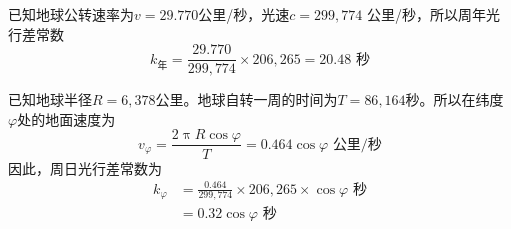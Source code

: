 已知地球公转速率为$v=29.770$公里/秒，光速$c=299,774$
公里/秒，所以周年光行差常数
  \begin{equation*}
    k_\text{年}=\frac{29.770}{299,774}\times 206,265=20.48\text{ 秒}
  \end{equation*}

已知地球半径$R=6,378$公里。地球自转一周的时间为$T=
86,164$秒。所以在纬度$\varphi$处的地面速度为
\begin{equation*}
  v_\varphi=\frac{2\uppi R\cos\varphi}{T}=0.464\cos\varphi\text{ 公里/秒}
\end{equation*}
因此，周日光行差常数为
\begin{align*}
  k_\varphi & =\frac{0.464}{299,774}\times 206,265\times\cos\varphi\text{ 秒} \\
            & =0.32\cos\varphi\text{ 秒}
\end{align*}